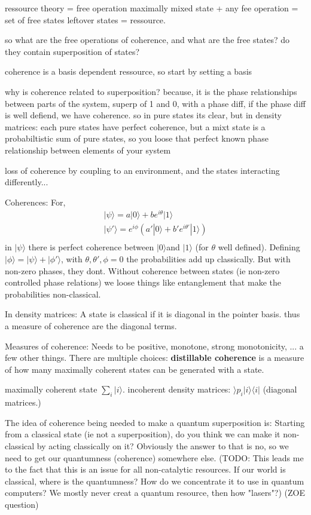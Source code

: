 \documentclass{article}
\begin{document}
ressource theory = free operation
maximally mixed state + any fee operation = set of free states
leftover states = ressource.

so what are the free operations of coherence, and what are the free states? do they contain superposition of states?

coherence is a basis dependent ressource, so start by setting a basis

why is coherence related to superposition? because, it is the phase relationships between parts of the system, superp of 1 and 0, with a phase diff, if the phase diff is well defiend, we have coherence. 
so in pure states its clear, but in density matrices: each pure states have perfect coherence, but a mixt state is a probabiltistic sum of pure states, so you loose that perfect known phase relationship between elements of your system

loss of coherence by coupling to an environment, and the states interacting differently...

Coherences: 
For,
\begin{align}
    |\psi\rangle =a|0\rangle+be^{i\theta}|1\rangle\\
    |\psi'\rangle =e^{i\phi}(a'|0\rangle+b'e^{i\theta'}|1\rangle)\\
\end{align}
in $|\psi\rangle$ there is perfect coherence between $|0\rangle$and $|1\rangle$ (for $\theta$ well defined). Defining $|\phi\rangle=|\psi\rangle+|\phi'\rangle$, with $\theta, \theta', \phi=0$ the probabilities add up classically. But with non-zero phases, they dont. Without coherence between states (ie non-zero controlled phase relations) we loose things like entanglement that make the probabilities non-classical.

In density matrices: A state is classical if it is diagonal in the pointer basis. thus a measure of coherence are the diagonal terms.

Measures of coherence: Needs to be positive, monotone, strong monotonicity, ... a few other things. 
There are multiple choices: \textbf{distillable coherence} is a measure of how many maximally coherent states can be generated with a state.

maximally coherent state $\sum_{i}|i\rangle$. 
incoherent density matrices: $\rangle p_i|i\rangle\langle i|$ (diagonal matrices.)

The idea of coherence being needed to make a quantum superposition is: Starting from a classical state (ie not a superposition), do you think we can make it non-classical by acting classically on it? Obviously the answer to that is no, so we need to get our quantumness (coherence) somewhere else. 
(TODO: This leads me to the fact that this is an issue for all non-catalytic resources. If our world is classical, where is the quantumness? How do we concentrate it to use in quantum computers? We mostly never creat a quantum resource, then how "lasers"?) (ZOE question)
\end{document}
